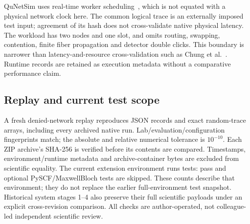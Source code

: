 QuNetSim uses real-time worker scheduling~\cite{qunetsim}, which is not equated with a physical network clock here. The common logical trace is an externally imposed test input; agreement of its hash does not cross-validate native physical latency. The workload has two nodes and one slot, and omits routing, swapping, contention, finite fiber propagation and detector double clicks. This boundary is narrower than latency-and-resource cross-validation such as Chung et al.~\cite{chung}. Runtime records are retained as execution metadata without a comparative performance claim.

\subsection{Replay and current test scope}
A fresh denied-network replay reproduces \ReplayRecords{} JSON records and \ReplayArrays{} exact random-trace arrays, including every archived native run. Lab/evaluation/configuration fingerprints match; the absolute and relative numerical tolerance is $10^{-10}$. Each ZIP archive's SHA-256 is verified before its contents are compared. Timestamps, environment/runtime metadata and archive-container bytes are excluded from scientific equality. The current extension environment runs \LatestTests{} tests: \LatestPass{} pass and \LatestSkip{} optional PySCF/MaxwellBloch tests are skipped. These counts describe that environment; they do not replace the earlier full-environment test snapshot. Historical system stages 1--4 also preserve their full scientific payloads under an explicit cross-revision comparison. All checks are author-operated, not colleague-led independent scientific review.
